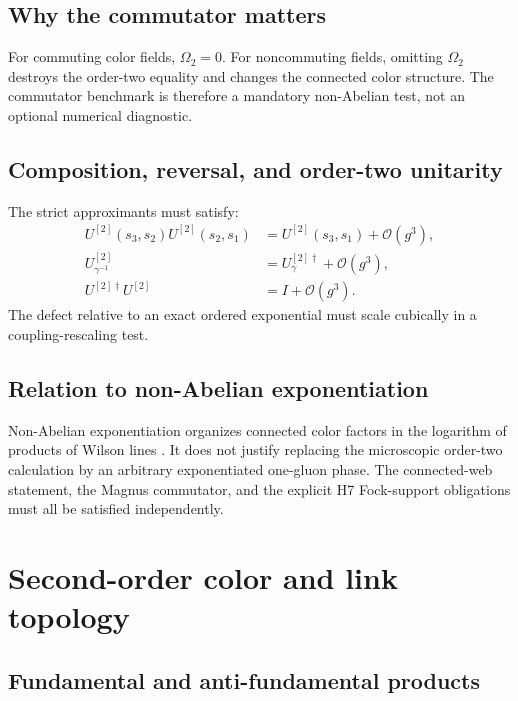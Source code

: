 \documentclass[11pt]{article}
\begin{document}
\subsection{Why the commutator matters}

For commuting color fields, \(\Omega_2=0\).  For noncommuting fields,
omitting \(\Omega_2\) destroys the order-two equality and changes the
connected color structure.  The commutator benchmark is therefore a mandatory
non-Abelian test, not an optional numerical diagnostic.

\subsection{Composition, reversal, and order-two unitarity}

The strict approximants must satisfy:
\begin{align}
 U^{[2]}(s_3,s_2)U^{[2]}(s_2,s_1)
 &=U^{[2]}(s_3,s_1)+\mathcal O(g^3),
 \label{eq:composition2}\\
 U_{\gamma^{-1}}^{[2]}
 &=U_\gamma^{[2]\dagger}+\mathcal O(g^3),
 \label{eq:reversal2}\\
 U^{[2]\dagger}U^{[2]}
 &=I+\mathcal O(g^3).
 \label{eq:unitarity2}
\end{align}
The defect relative to an exact ordered exponential must scale cubically in a
coupling-rescaling test.

\subsection{Relation to non-Abelian exponentiation}

Non-Abelian exponentiation organizes connected color factors in the logarithm
of products of Wilson lines \cite{Gardi2013}.  It does not justify replacing
the microscopic order-two calculation by an arbitrary exponentiated
one-gluon phase.  The connected-web statement, the Magnus commutator, and the
explicit H7 Fock-support obligations must all be satisfied independently.

\section{Second-order color and link topology}
\label{sec:color2}

\subsection{Fundamental and anti-fundamental products}
\end{document}
